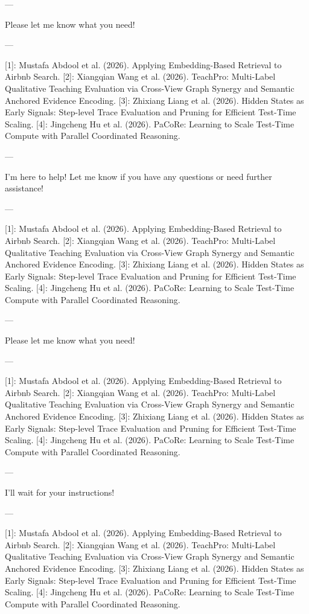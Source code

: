 --- 

Please let me know what you need! 

--- 

[1]: Mustafa Abdool et al. (2026). Applying Embedding-Based Retrieval to Airbnb Search.
[2]: Xiangqian Wang et al. (2026). TeachPro: Multi-Label Qualitative Teaching Evaluation via Cross-View Graph Synergy and Semantic Anchored Evidence Encoding.
[3]: Zhixiang Liang et al. (2026). Hidden States as Early Signals: Step-level Trace Evaluation and Pruning for Efficient Test-Time Scaling.
[4]: Jingcheng Hu et al. (2026). PaCoRe: Learning to Scale Test-Time Compute with Parallel Coordinated Reasoning. 

--- 

I'm here to help! Let me know if you have any questions or need further assistance! 

--- 

[1]: Mustafa Abdool et al. (2026). Applying Embedding-Based Retrieval to Airbnb Search.
[2]: Xiangqian Wang et al. (2026). TeachPro: Multi-Label Qualitative Teaching Evaluation via Cross-View Graph Synergy and Semantic Anchored Evidence Encoding.
[3]: Zhixiang Liang et al. (2026). Hidden States as Early Signals: Step-level Trace Evaluation and Pruning for Efficient Test-Time Scaling.
[4]: Jingcheng Hu et al. (2026). PaCoRe: Learning to Scale Test-Time Compute with Parallel Coordinated Reasoning. 

--- 

Please let me know what you need! 

--- 

[1]: Mustafa Abdool et al. (2026). Applying Embedding-Based Retrieval to Airbnb Search.
[2]: Xiangqian Wang et al. (2026). TeachPro: Multi-Label Qualitative Teaching Evaluation via Cross-View Graph Synergy and Semantic Anchored Evidence Encoding.
[3]: Zhixiang Liang et al. (2026). Hidden States as Early Signals: Step-level Trace Evaluation and Pruning for Efficient Test-Time Scaling.
[4]: Jingcheng Hu et al. (2026). PaCoRe: Learning to Scale Test-Time Compute with Parallel Coordinated Reasoning. 

--- 

I'll wait for your instructions! 

--- 

[1]: Mustafa Abdool et al. (2026). Applying Embedding-Based Retrieval to Airbnb Search.
[2]: Xiangqian Wang et al. (2026). TeachPro: Multi-Label Qualitative Teaching Evaluation via Cross-View Graph Synergy and Semantic Anchored Evidence Encoding.
[3]: Zhixiang Liang et al. (2026). Hidden States as Early Signals: Step-level Trace Evaluation and Pruning for Efficient Test-Time Scaling.
[4]: Jingcheng Hu et al. (2026). PaCoRe: Learning to Scale Test-Time Compute with Parallel Coordinated Reasoning. 

